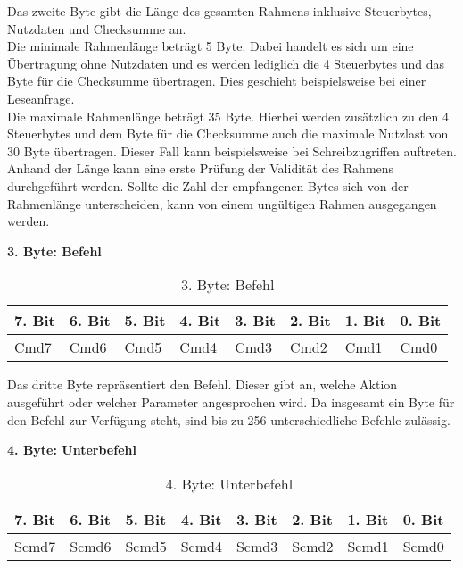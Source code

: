 Das zweite Byte gibt die Länge des gesamten Rahmens inklusive Steuerbytes, Nutzdaten und Checksumme an.\\ Die minimale Rahmenlänge beträgt 5 Byte. Dabei handelt es sich um eine Übertragung ohne Nutzdaten und es werden lediglich die 4 Steuerbytes und das Byte für die Checksumme übertragen. Dies geschieht beispielsweise bei einer Leseanfrage.\\
Die maximale Rahmenlänge beträgt 35 Byte. Hierbei werden zusätzlich zu den 4 Steuerbytes und dem Byte für die Checksumme auch die maximale Nutzlast von 30 Byte übertragen. Dieser Fall kann beispielsweise bei Schreibzugriffen auftreten.\\
Anhand der Länge kann eine erste Prüfung der Validität des Rahmens durchgeführt werden. Sollte die Zahl der empfangenen Bytes sich von der Rahmenlänge unterscheiden, kann von einem ungültigen Rahmen ausgegangen werden.


\textbf{3. Byte: Befehl}

\begin{table}[H]
\begin{center}
\begin{tabularx}{\textwidth}{|X|X|X|X|X|X|X|X|}\hline
 7. Bit & 6. Bit & 5. Bit & 4. Bit & 3. Bit & 2. Bit & 1. Bit & 0. Bit\\ \hline
 Cmd7 & Cmd6 & Cmd5 & Cmd4 & Cmd3 & Cmd2 & Cmd1 & Cmd0\\ \hline
\end{tabularx}
\caption{3. Byte: Befehl}
\label{table_3Byte}
\end{center}
\end{table}

Das dritte Byte repräsentiert den Befehl. Dieser gibt an, welche Aktion ausgeführt oder welcher Parameter angesprochen wird. Da insgesamt ein Byte für den Befehl zur Verfügung steht, sind bis zu 256 unterschiedliche Befehle zulässig.


\textbf{4. Byte: Unterbefehl}

\begin{table}[H]
\begin{center}
\begin{tabularx}{\textwidth}{|X|X|X|X|X|X|X|X|}\hline
 7. Bit & 6. Bit & 5. Bit & 4. Bit & 3. Bit & 2. Bit & 1. Bit & 0. Bit\\ \hline
 Scmd7 & Scmd6 & Scmd5 & Scmd4 & Scmd3 & Scmd2 & Scmd1 & Scmd0\\ \hline
\end{tabularx}
\caption{4. Byte: Unterbefehl}
\label{table_4Byte}
\end{center}
\end{table}

